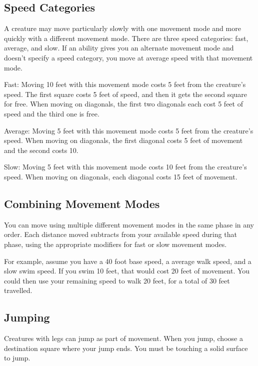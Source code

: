   \subsection{Speed Categories}\label{Speed Categories}
    A creature may move particularly slowly with one movement mode and more quickly with a different movement mode.
    There are three speed categories: fast, average, and slow.
    If an ability gives you an alternate movement mode and doesn't specify a speed category, you move at average speed with that movement mode.
    \begin{raggeditemize}
      \item Fast: Moving 10 feet with this movement mode costs 5 feet from the creature's speed.
        The first square costs 5 feet of speed, and then it gets the second square for free.
        When moving on diagonals, the first two diagonals each cost 5 feet of speed and the third one is free.
      \item Average: Moving 5 feet with this movement mode costs 5 feet from the creature's speed.
        When moving on diagonals, the first diagonal costs 5 feet of movement and the second costs 10.
      \item Slow: Moving 5 feet with this movement mode costs 10 feet from the creature's speed.
        When moving on diagonals, each diagonal costs 15 feet of movement.
    \end{raggeditemize}

  \subsection{Combining Movement Modes}
    You can move using multiple different movement modes in the same phase in any order.
    Each distance moved subtracts from your available speed during that phase, using the appropriate modifiers for fast or slow movement modes.

    For example, assume you have a 40 foot base speed, a average walk speed, and a slow swim speed.
    If you swim 10 feet, that would cost 20 feet of movement.
    You could then use your remaining speed to walk 20 feet, for a total of 30 feet travelled.

  \subsection{Jumping}\label{Jumping}
    Creatures with legs can jump as part of movement.
    When you jump, choose a destination square where your jump ends.
    You must be touching a solid surface to jump.

